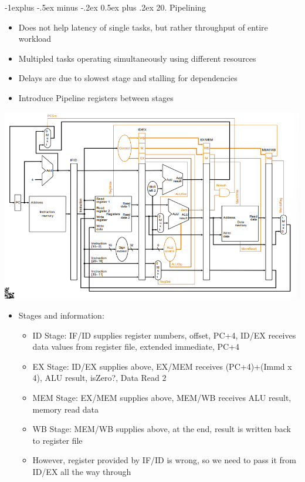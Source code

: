 \documentclass[10pt, portrait]{article}
\makeatletter
\renewcommand{\section}{\@startsection{section}{1}{0mm}%
                                {-1ex plus -.5ex minus -.2ex}%
                                {0.5ex plus .2ex}%
                                {\normalfont\large\bfseries}}
\renewcommand{\section}{\@startsection{section}{2}{0mm}%
                                {-1explus -.5ex minus -.2ex}%
                                {0.5ex plus .2ex}%
                                {\normalfont\normalsize\bfseries}}
\makeatother
\begin{document}
\begin{multicols*}{2}
\section{20. Pipelining}
\begin{itemize}
    \item Does not help latency of single tasks, but rather throughput of entire workload
    \item Multipled tasks operating simultaneously using different resources
    \item Delays are due to slowest stage and stalling for dependencies
    \item Introduce Pipeline registers between stages
\end{itemize}
\begin{center}
    \includegraphics[width=\linewidth]{pipeline.png}
\end{center}
\begin{itemize}
    \item Stages and information:
    \begin{itemize}
        \item ID Stage: IF/ID supplies register numbers, offset, PC+4, ID/EX receives data values from register file, extended immediate, PC+4
        \item EX Stage: ID/EX supplies above, EX/MEM receives (PC+4)+(Immd x 4), ALU result, isZero?, Data Read 2
        \item MEM Stage: EX/MEM supplies above, MEM/WB receives ALU result, memory read data
        \item WB Stage: MEM/WB supplies above, at the end, result is written back to register file
        \item However, register provided by IF/ID is wrong, so we need to pass it from ID/EX all the way through

\end{itemize}
\end{itemize}
\end{multicols*}
\end{document}
